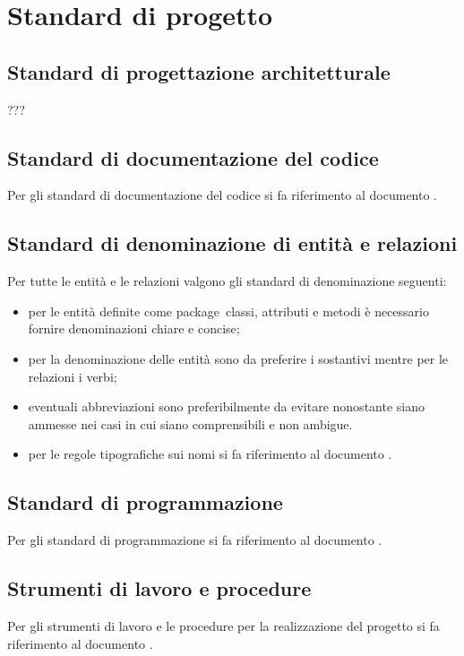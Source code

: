 \documentclass[../DefinizioneDiProdotto.tex]{subfiles}
\begin{document}
\section{Standard di progetto}
	\subsection{Standard di progettazione architetturale}
		??? 
	
	\subsection{Standard di documentazione del codice}
		Per gli standard di documentazione del codice si fa riferimento al documento \normediprogettov.

	\subsection{Standard di denominazione di entità e relazioni}
		Per tutte le entità e le relazioni valgono gli standard di denominazione seguenti:
		\begin{itemize}
			\item per le entità definite come package\g\, classi, attributi e metodi è necessario fornire denominazioni chiare e concise;
			\item per la denominazione delle entità sono da preferire i sostantivi mentre per le relazioni i verbi;
			\item eventuali abbreviazioni sono preferibilmente da evitare nonostante siano ammesse nei casi in cui siano comprensibili e non ambigue.
			\item per le regole tipografiche sui nomi si fa riferimento al documento \normediprogettov.
		\end{itemize}	
		

	\subsection{Standard di programmazione}
		Per gli standard di programmazione si fa riferimento al documento \normediprogettov.

	\subsection{Strumenti di lavoro e procedure}
		Per gli strumenti di lavoro e le procedure per la realizzazione del progetto si fa riferimento al documento \normediprogettov.
	
\end{document}
